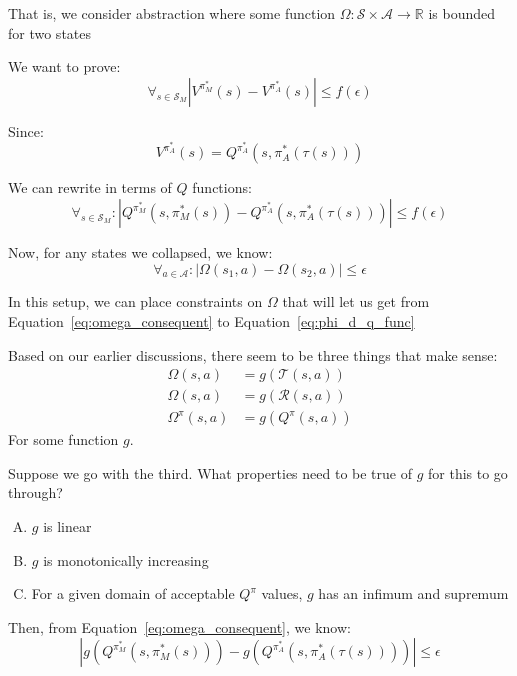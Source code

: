 \documentclass[11pt]{amsart}
\begin{document}
That is, we consider abstraction where some function $\Omega : \mathcal{S} \times \mathcal{A} \rightarrow \mathbb{R}$ is bounded for two states

We want to prove:
\begin{equation}
\forall_{s \in \mathcal{S}_M} | V^{\pi_M^*}(s) - V^{\pi_A^*}(s) | \leq f(\epsilon)
\end{equation}

Since:
\begin{equation}
V^{\pi_A^*}(s) = Q^{\pi_A^*}(s, \pi_A^*(\tau(s)))
\end{equation}

We can rewrite in terms of $Q$ functions:
\begin{equation}
\forall_{s \in \mathcal{S}_M} : | Q^{\pi_M^*}(s, \pi_M^*(s)) - Q^{\pi_A^*}(s, \pi_A^*(\tau(s))) | \leq f(\epsilon)
\label{eq:phi_d_q_func}
\end{equation}

Now, for any states we collapsed, we know:
\begin{equation}
\forall_{a \in \mathcal{A}} : | \Omega(s_1,a) - \Omega(s_2,a) | \leq \epsilon
\label{eq:omega_consequent}
\end{equation}

In this setup, we can place constraints on $\Omega$ that will let us get from Equation~\ref{eq:omega_consequent} to Equation~\ref{eq:phi_d_q_func}

Based on our earlier discussions, there seem to be three things that make sense:
\begin{align*}
\Omega(s,a) &= g(\mathcal{T}(s,a)) \\
\Omega(s,a) &= g(\mathcal{R}(s,a)) \\
\Omega^\pi(s,a) &= g(Q^\pi(s,a))
\end{align*}
For some function $g$.

Suppose we go with the third. What properties need to be true of $g$ for this to go through?
\begin{enumerate}[A.]
\item $g$ is linear
\item $g$ is monotonically increasing
\item For a given domain of acceptable $Q^\pi$ values, $g$ has an infimum and supremum
\end{enumerate}

Then, from Equation~\ref{eq:omega_consequent}, we know:
\begin{equation}
|g(Q^{\pi_M^*}(s,\pi_M^*(s))) - g(Q^{\pi_A^*}(s, \pi_A^*(\tau(s)))) | \leq \epsilon
\end{equation}
\end{document}
